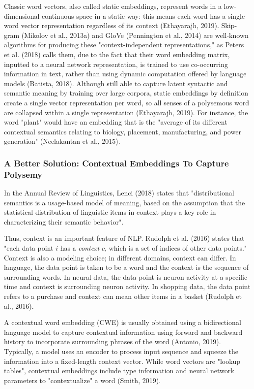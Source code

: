 Classic word vectors, also called static embeddings, represent words in a low-dimensional continuous space in a static way: this means each word has a single word vector representation regardless of its context (Ethayarajh, 2019). Skip-gram (Mikolov et al., 2013a) and GloVe (Pennington et al., 2014) are well-known algorithms for producing these "context-independent representations," as Peters et al. (2018) calls them, due to the fact that their word embedding matrix, inputted to a neural network representation, is trained to use co-occurring information in text, rather than using dynamic computation offered by language models (Batista, 2018). Although still able to capture latent syntactic and semantic meaning by training over large corpora, static embeddings by definition create a single vector representation per word, so all senses of a polysemous word are collapsed within a single representation (Ethayarajh, 2019). For instance, the word "plant" would have an embedding that is the "average of its different contextual semantics relating to biology, placement, manufacturing, and power generation" (Neelakantan et al., 2015). 

\subsubsection{A Better Solution: Contextual Embeddings To Capture Polysemy}

In the Annual Review of Linguistics, Lenci (2018) states that "distributional semantics is a usage-based model of meaning, based on the assumption that the statistical distribution of linguistic items in context plays a key role in characterizing their semantic behavior".

Thus, context is an important feature of NLP. Rudolph et al. (2016) states that "each data point $i$ has a \emph{context} $c$, which is a set of indices of other data points." Context is also a modeling choice; in different domains, context can differ. In language, the data point is taken to be a word and the context is the sequence of surrounding words. In neural data, the data point is neuron activity at a specific time and context is surrounding neuron activity. In shopping data, the data point refers to a purchase and context can mean other items in a basket (Rudolph et al., 2016). 

A contextual word embedding (CWE) is usually obtained using a bidirectional language model to capture contextual information using forward and backward history to incorporate surrounding phrases of the word (Antonio, 2019). Typically, a model uses an encoder to process input sequence and squeeze the information into a fixed-length context vector. While word vectors are "lookup tables", contextual embeddings include type information and neural network parameters to "contextualize" a word (Smith, 2019). 

